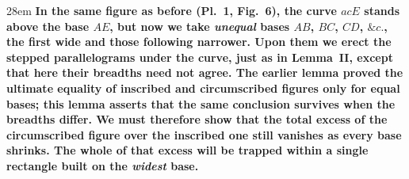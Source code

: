 \documentclass[border=4pt]{standalone}
\begin{document}
\begin{varwidth}{28em}
\large\bfseries
In the same figure as before (Pl.~1, Fig.~6), the curve $acE$ stands above the base $AE$, but now we take \emph{unequal} bases $AB$, $BC$, $CD$, $\&c.$, the first wide and those following narrower. Upon them we erect the stepped parallelograms under the curve, just as in \textbf{Lemma~II}, except that here their breadths need not agree. The earlier lemma proved the ultimate equality of inscribed and circumscribed figures only for equal bases; this lemma asserts that the same conclusion survives when the breadths differ. We must therefore show that the total excess of the circumscribed figure over the inscribed one still vanishes as every base shrinks. The whole of that excess will be trapped within a single rectangle built on the \emph{widest} base.
\end{varwidth}
\end{document}
